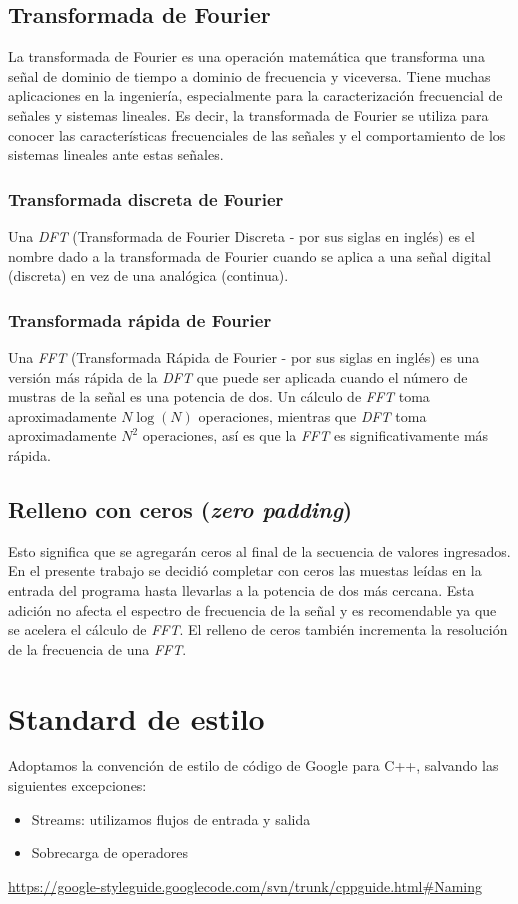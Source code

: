 \documentclass{article}
\begin{document}
  \subsection{Transformada de Fourier}
    La transformada de Fourier es una operación matemática que transforma una señal de dominio
    de tiempo a dominio de frecuencia y viceversa. Tiene muchas aplicaciones en la ingeniería,
    especialmente para la caracterización frecuencial de señales y sistemas lineales.
    Es decir, la transformada de Fourier se utiliza para conocer las características
    frecuenciales de las señales y el comportamiento de los sistemas lineales ante estas
    señales.
    \subsubsection{Transformada discreta de Fourier}
      Una \textit{DFT} (Transformada de Fourier Discreta - por sus siglas en inglés) es el nombre
      dado a la transformada de Fourier cuando se aplica a una señal digital (discreta) en vez de una
      analógica (continua).
	  
    \subsubsection{Transformada rápida de Fourier}
      Una \textit{FFT} (Transformada Rápida de Fourier - por sus siglas en inglés) es una versión más rápida
      de la \textit{DFT} que puede ser aplicada cuando el número de mustras de la señal es una potencia de dos.
	  Un cálculo de \textit{FFT} toma aproximadamente $N \log (N)$ operaciones, mientras que \textit{DFT}
      toma aproximadamente $N^2$ operaciones, así es que la \textit{FFT} es significativamente más rápida.

  \subsection{Relleno con ceros (\textit{zero padding})}
    Esto significa que se agregarán ceros al final de la secuencia de valores ingresados. En
    el presente trabajo se decidió completar con ceros las muestas leídas en la entrada del programa
    hasta llevarlas a la potencia de dos más cercana. Esta adición no afecta el espectro de frecuencia
    de la señal y es recomendable ya que se acelera el cálculo de \textit{FFT}. El relleno de ceros también incrementa
    la resolución de la frecuencia de una \textit{FFT}.

\section{Standard de estilo}
  Adoptamos la convención de estilo de código de Google para C++, salvando las siguientes excepciones:
  \begin{itemize}
    \item Streams: utilizamos flujos de entrada y salida
    \item Sobrecarga de operadores
  \end{itemize}
  \url{https://google-styleguide.googlecode.com/svn/trunk/cppguide.html#Naming}
\end{document}
